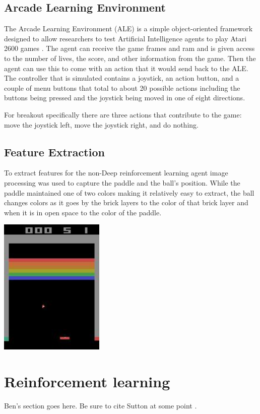 \documentclass{article}
\begin{document}
\subsection{Arcade Learning Environment}
The Arcade Learning Environment (ALE) is a simple object-oriented framework designed to allow researchers to test Artificial Intelligence agents to play Atari 2600 games \cite{ale}. The agent can receive the game frames and ram and is given access to the number of lives, the score, and other information from the game. Then the agent can use this to come with an action that it would send back to the ALE. The controller that is simulated contains a joystick, an action button, and a couple of menu buttons that total to about 20 possible actions including the buttons being pressed and the joystick being moved in one of eight directions.

For breakout specifically there are three actions that contribute to the game: move the joystick left, move the joystick right, and do nothing.

\subsection{Feature Extraction}
To extract features for the non-Deep reinforcement learning agent image processing was used to capture the paddle and the ball's position. While the paddle maintained one of two colors making it relatively easy to extract, the ball changes colors as it goes by the brick layers to the color of that brick layer and when it is in open space to the color of the paddle. 

  \begin{center}
  \includegraphics[width=50mm]{tmp2.jpg}
  \end{center}

\section{Reinforcement learning}
Ben's section goes here. Be sure to cite Sutton at some point \cite{sutton}.
\end{document}
